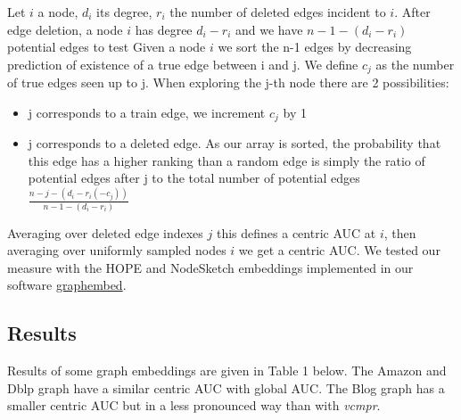\documentclass{article}
\begin{document}
Let $i$ a node, $d_{i}$ its degree, $r_{i}$ the number of deleted edges incident to $i$.
After edge deletion, a node $i$ has degree $d_{i} - r_{i}$ and we have  $ n - 1 - (d_{i} - r_{i})$  potential edges to test
Given a node $i$ we sort the n-1 edges by decreasing prediction of existence of a true edge between i and j. We define $c_{j}$  as the number of true edges seen up to j.
When exploring the j-th node there are 2 possibilities:
\begin{itemize}
    \item j corresponds to a train edge, we increment $c_{j}$ by 1
    \item j corresponds to a deleted edge. As our array is sorted, the probability that this edge has a higher
          ranking than a random edge is simply the ratio of potential edges after j to
          the total number of potential edges $ \frac{n-j-(d_{i}-r_{i}(-c_{j}))}{n-1-(d_{i}-r_{i})}$
\end{itemize}
Averaging over deleted edge indexes $j$ this defines a centric AUC at  $i$, then averaging over uniformly sampled nodes $i$ we get a centric AUC.
We tested our measure with the HOPE \citep{Ou2016asymmetric} and NodeSketch \citep{Yang2019nodesketch} embeddings implemented
in our software \href{https://github.com/jean-pierreBoth/graphembed}{\color{blue}graphembed}.

\subsection{Results}

Results of some graph embeddings are given in Table 1 below.
The Amazon and Dblp graph have a similar centric AUC with global AUC. The Blog graph has a smaller centric AUC but in a less pronounced way than with \textit{vcmpr}.
\end{document}
